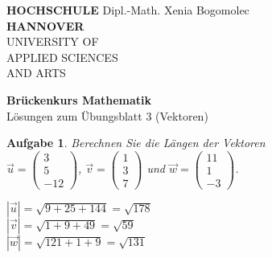 \documentclass[12pt]{article}
\newtheorem{exercise}[satz]{Aufgabe}
\begin{document}
\pagestyle{empty}
\parindent 0cm
\begin{minipage}{14cm}
\footnotesize{\textbf{HOCHSCHULE} \hfill Dipl.-Math. Xenia Bogomolec\\
\textbf{HANNOVER}\\
UNIVERSITY OF\\
APPLIED SCIENCES\\
AND ARTS
}
\end{minipage}
\vspace{1.0cm}

\begin{center}
 {\Large \bf Br\"uckenkurs Mathematik} \\
 \vspace{0.5cm}
 {\large L\"osungen zum \"Ubungsblatt 3 (Vektoren)}  \\

\end{center}
\vspace{0.5cm}
\normalsize
\parindent0cm

\begin{exercise}
  Berechnen Sie die L\"angen der Vektoren \\
  $\vec{u}=\left(\begin{array}{r} 3 \\ 5 \\ -12 \end{array}\right)$,
  $\vec{v}=\left(\begin{array}{r} 1 \\ 3 \\ 7 \end{array}\right)$ und
  $\vec{w}=\left(\begin{array}{r} 11 \\ 1 \\ -3 \end{array}\right)$. \\ 

  \vspace{0.1cm}

  $|\vec{u}| = \sqrt{9+25+144} = \sqrt{178}$\\
  $|\vec{v}| = \sqrt{1+9+49} = \sqrt{59}$\\
  $|\vec{w}| = \sqrt{121+1+9} = \sqrt{131}$ 

\end{exercise}

\vspace{0.1cm}
\end{document}
